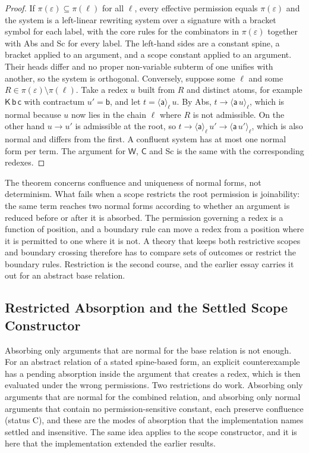 \documentclass[11pt]{article}
\theoremstyle{definition}
\theoremstyle{remark}
\newcommand{\cC}{\mathsf{C}}
\newcommand{\cK}{\mathsf{K}}
\newcommand{\cW}{\mathsf{W}}
\newcommand{\br}[2]{\langle #1\rangle_{#2}}
\newcommand{\Ct}{status C}
\begin{document}
\begin{proof}
If $\pi(\varepsilon)\subseteq\pi(\ell)$ for all $\ell$, every effective permission equals $\pi(\varepsilon)$ and the system is a left-linear rewriting system over a signature with a bracket symbol for each label, with the core rules for the combinators in $\pi(\varepsilon)$ together with Abs and Sc for every label. The left-hand sides are a constant spine, a bracket applied to an argument, and a scope constant applied to an argument. Their heads differ and no proper non-variable subterm of one unifies with another, so the system is orthogonal. Conversely, suppose some $\ell$ and some $R\in\pi(\varepsilon)\setminus\pi(\ell)$. Take a redex $u$ built from $R$ and distinct atoms, for example $\cK\,\mathsf b\,\mathsf c$ with contractum $u'=\mathsf b$, and let $t=\br{\mathsf a}\ell\,u$. By Abs, $t\to\br{\mathsf a\,u}\ell$, which is normal because $u$ now lies in the chain $\ell$ where $R$ is not admissible. On the other hand $u\to u'$ is admissible at the root, so $t\to\br{\mathsf a}\ell\,u'\to\br{\mathsf a\,u'}\ell$, which is also normal and differs from the first. A confluent system has at most one normal form per term. The argument for $\cW$, $\cC$ and Sc is the same with the corresponding redexes.
\end{proof}

The theorem concerns confluence and uniqueness of normal forms, not determinism. What fails when a scope restricts the root permission is joinability: the same term reaches two normal forms according to whether an argument is reduced before or after it is absorbed. The permission governing a redex is a function of position, and a boundary rule can move a redex from a position where it is permitted to one where it is not. A theory that keeps both restrictive scopes and boundary crossing therefore has to compare sets of outcomes or restrict the boundary rules. Restriction is the second course, and the earlier essay carries it out for an abstract base relation.

\subsection{Restricted Absorption and the Settled Scope Constructor}

Absorbing only arguments that are normal for the base relation is not enough. For an abstract relation of a stated spine-based form, an explicit counterexample has a pending absorption inside the argument that creates a redex, which is then evaluated under the wrong permissions. Two restrictions do work. Absorbing only arguments that are normal for the combined relation, and absorbing only normal arguments that contain no permission-sensitive constant, each preserve confluence (\Ct), and these are the modes of absorption that the implementation names settled and insensitive. The same idea applies to the scope constructor, and it is here that the implementation extended the earlier results.
\end{document}
